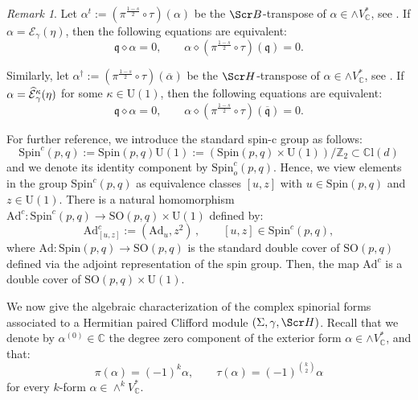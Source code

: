 \documentclass[10pt,a4paper,twoside,reqno]{amsart}
\theoremstyle{plain}
\theoremstyle{definition}
\theoremstyle{remark}
\newtheorem{remark}[thm]{Remark}
\def\C{\mathbb{C}}
\def\Ad{\mathrm{Ad}}
\def\frq{\mathfrak{q}}
\def\scB{\Scr B}
\def\scS{\Scr H}
\def\Spin{\mathrm{Spin}}
\def\Spin{\mathrm{Spin}}
\def\SO{\mathrm{SO}}
\def\U{\mathrm{U}}
\def\cE{\mathcal{E}}
\def\hcE{\smash{\widehat{\mathcal{E}}}}
\def\mCl{\mathbb{C}\mathrm{l}}
\begin{document}
\begin{remark}\label{remark:equivalent_constrained_eq}
    Let $\alpha^t:=(\pi^{\frac{1-s}{2}}\circ\tau)(\alpha)$ be the $\scB$-transpose of $\alpha\in\wedge V^*_\C$, see \cite[Lemma 3.21]{Algebraic_Complex_Square_2025}. If $\alpha=\cE_\gamma(\eta)$, then the following equations are equivalent: $$\frq\diamond\alpha=0,\qquad \alpha\diamond(\pi^{\frac{1-s}{2}}\circ\tau)(\frq)=0.$$

    Similarly, let $\alpha^\dagger:=(\pi^{\frac{1-s}{2}}\circ\tau)(\overline{\alpha})$ be the $\scS$-transpose of $\alpha\in\wedge V^*_\C$, see \cite[Lemma 3.12]{Algebraic_Complex_Square_2025}. If $\alpha=\hcE^{\kappa}_{\gamma}(\eta)$ for some $\kappa\in\U(1)$, then the following equations are equivalent: $$\frq\diamond\alpha=0,\qquad\alpha\diamond(\pi^{\frac{1-s}{2}}\circ\tau)(\overline{\frq})=0.$$
\end{remark}

For further reference, we introduce the standard spin-c group as follows:
\begin{equation*}
\Spin^c(p,q):=\Spin(p,q)\U(1):=(\Spin(p,q)\times\U(1))/\mathbb{Z}_2 \subset\mCl(d)    
\end{equation*}
and we denote its identity component by $\Spin^c_o(p,q)$. Hence, we view elements in the group $\Spin^c(p,q)$ as equivalence classes $[u,z]$ with $u\in\Spin(p,q)$ and $z\in\U(1)$. There is a natural homomorphism $\Ad^c\colon\Spin^c(p,q)\to\SO(p,q)\times\U(1)$ defined by: 
\begin{equation*}
\Ad^c_{[u,z]}:=(\Ad_u,z^2) \, , \qquad [u,z] \in \Spin^c(p,q),
\end{equation*}
where $\Ad \colon \Spin(p,q) \to \SO(p,q)$ is the standard double cover of $\SO(p,q)$ defined via the adjoint representation of the spin group. Then, the map $\Ad^c$ is a double cover of $\SO(p,q)\times\U(1)$. \medskip

We now give the algebraic characterization of the complex spinorial forms associated to a Hermitian paired Clifford module $(\Sigma,\gamma,\scS)$. Recall that we denote by $\alpha^{(0)}\in\C$ the degree zero component of the exterior form $\alpha\in\wedge V^*_\C$, and that: $$\pi(\alpha)=(-1)^k\alpha,\qquad\tau(\alpha)=(-1)^{\binom{k}{2}}\alpha$$ for every $k$-form $\alpha\in\wedge^k V^*_\C$.
\end{document}
